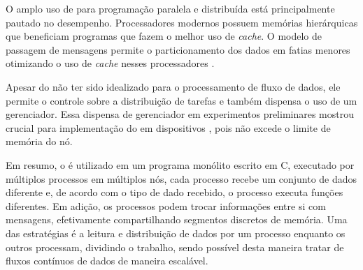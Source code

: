 O amplo uso de \mpi para programação paralela e distribuída está principalmente
pautado no desempenho.
Processadores modernos possuem memórias hierárquicas que beneficiam programas
que fazem o melhor uso de \emph{cache}.
O modelo de passagem de mensagens permite o particionamento dos dados em fatias
menores otimizando o uso de \emph{cache} nesses processadores \cite{MpiMitBookGroupp2014}.

Apesar do \mpi não ter sido idealizado para o processamento de fluxo de dados,
ele permite o controle sobre a distribuição de tarefas e também dispensa o uso
de um gerenciador.
Essa dispensa de gerenciador em experimentos preliminares mostrou crucial para
implementação do \mfog em dispositivos \iot, pois não excede o limite de memória
do nó.

Em resumo, o \mpi é utilizado em um programa monólito escrito em C, executado
por múltiplos processos em múltiplos nós, cada processo recebe um conjunto de
dados diferente e, de acordo com o tipo de dado recebido, o processo executa
funções diferentes.
Em adição, os processos podem trocar informações entre si com mensagens,
efetivamente compartilhando segmentos discretos de memória.
Uma das estratégias é a leitura e distribuição de dados por um processo enquanto
os outros processam, dividindo o trabalho, sendo possível desta maneira tratar
de fluxos contínuos de dados de maneira escalável.

